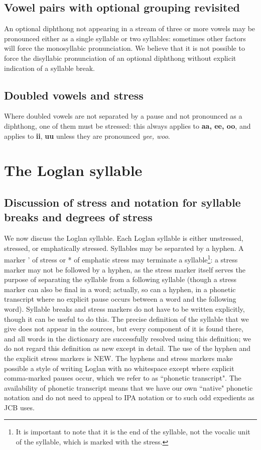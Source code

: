 \documentclass[12pt]{book}
\begin{document}
\subsection{Vowel pairs with optional grouping revisited}

An optional diphthong not appearing in a stream of three or more vowels may be pronounced either as a single syllable or two syllables:  sometimes other factors will force the monosyllabic pronunciation.  We believe that it is not possible to force the disyllabic pronunciation of an optional diphthong without explicit indication of a syllable break.

\subsection{Doubled vowels and stress}

Where doubled vowels are not separated by a pause and not pronounced as a diphthong, one of them must be stressed:  this always applies to {\bf aa, ee, oo}, and applies
to {\bf ii}, {\bf uu} unless they are pronounced {\em yee, woo}.

\section{The Loglan syllable}

\subsection{Discussion of stress and notation for syllable breaks and degrees of stress}

We now discuss the Loglan syllable.  Each Loglan syllable is either unstressed, stressed, or emphatically stressed.  Syllables may be separated by a hyphen.
A marker ' of stress or * of emphatic stress may terminate a syllable\footnote{It is important to note that it is the end of the syllable, not the vocalic unit of the syllable, which is marked with the stress.}:  a stress marker may not be followed by a hyphen, as the stress marker itself serves the purpose of separating the syllable from a following syllable (though a stress marker can also be final in a word; actually, so can a hyphen, in a phonetic transcript where no explicit pause occurs between a word and the following word).  Syllable breaks and stress markers do not have to be written explicitly, though it can be useful to do this.  The precise definition of the syllable that we give does not appear in the sources, but every component of it is found there, and all words in the dictionary are successfully resolved using this definition;  we do not regard this definition as new except in detail.  The use of the hyphen and the explicit stress markers is NEW.  The hyphens and stress markers make possible a style of writing Loglan with no whitespace except where explicit comma-marked pauses occur, which we refer to as ``phonetic transcript".  The availability of phonetic transcript means that we have our own ``native" phonetic notation and do not need to appeal to IPA notation or to such odd expedients as JCB uses.
\end{document}
